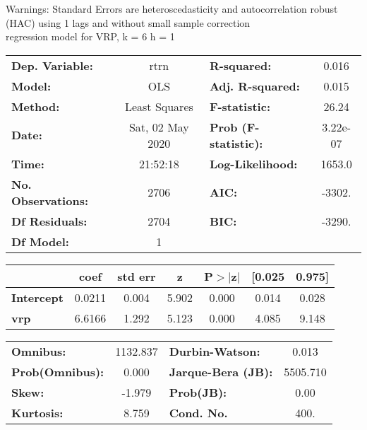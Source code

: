 Warnings: \newline
 [1] Standard Errors are heteroscedasticity and autocorrelation robust (HAC) using 1 lags and without small sample correction\\ 

regression model for VRP, k = 6 h = 1\begin{center}
\begin{tabular}{lclc}
\toprule
\textbf{Dep. Variable:}    &       rtrn       & \textbf{  R-squared:         } &     0.016   \\
\textbf{Model:}            &       OLS        & \textbf{  Adj. R-squared:    } &     0.015   \\
\textbf{Method:}           &  Least Squares   & \textbf{  F-statistic:       } &     26.24   \\
\textbf{Date:}             & Sat, 02 May 2020 & \textbf{  Prob (F-statistic):} &  3.22e-07   \\
\textbf{Time:}             &     21:52:18     & \textbf{  Log-Likelihood:    } &    1653.0   \\
\textbf{No. Observations:} &        2706      & \textbf{  AIC:               } &    -3302.   \\
\textbf{Df Residuals:}     &        2704      & \textbf{  BIC:               } &    -3290.   \\
\textbf{Df Model:}         &           1      & \textbf{                     } &             \\
\bottomrule
\end{tabular}
\begin{tabular}{lcccccc}
                   & \textbf{coef} & \textbf{std err} & \textbf{z} & \textbf{P$> |$z$|$} & \textbf{[0.025} & \textbf{0.975]}  \\
\midrule
\textbf{Intercept} &       0.0211  &        0.004     &     5.902  &         0.000        &        0.014    &        0.028     \\
\textbf{vrp}       &       6.6166  &        1.292     &     5.123  &         0.000        &        4.085    &        9.148     \\
\bottomrule
\end{tabular}
\begin{tabular}{lclc}
\textbf{Omnibus:}       & 1132.837 & \textbf{  Durbin-Watson:     } &    0.013  \\
\textbf{Prob(Omnibus):} &   0.000  & \textbf{  Jarque-Bera (JB):  } & 5505.710  \\
\textbf{Skew:}          &  -1.979  & \textbf{  Prob(JB):          } &     0.00  \\
\textbf{Kurtosis:}      &   8.759  & \textbf{  Cond. No.          } &     400.  \\
\bottomrule
\end{tabular}
\end{center}

